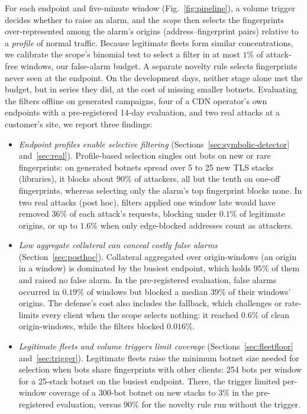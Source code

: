 \documentclass[conference,letterpaper,10pt]{IEEEtran}
\newcommand\1{\textit{(i)}}
\newcommand\2{\textit{(ii)}}
\newcommand\3{\textit{(iii)}}
\newcommand\4{\textit{(iv)}}
\newcommand\5{\textit{(v)}}
\newcommand\6{\textit{(vi)}}
\newcommand\7{\textit{(vii)}}
\newcommand\8{\textit{(viii)}}
\newcommand\9{\textit{(ix)}}
\begin{document}
For each endpoint and five-minute window (Fig.~\ref{fig:pipeline}), a volume trigger decides whether to raise an alarm, and the \textit{scope} then selects the fingerprints over-represented among the alarm's origins (address--fingerprint pairs) relative to a \textit{profile} of normal traffic. Because legitimate fleets form similar concentrations, we calibrate the scope's binomial test to select a filter in at most $1\%$ of attack-free windows, our false-alarm budget. A separate novelty rule selects fingerprints never seen at the endpoint. On the development days, neither stage alone met the budget, but in series they did, at the cost of missing smaller botnets. Evaluating the filters offline on generated campaigns, four of a CDN operator's own endpoints with a pre-registered 14-day evaluation, and two real attacks at a customer's site, we report three findings:
\begin{itemize}
\item \textit{Endpoint profiles enable selective filtering} (Sections~\ref{sec:symbolic-detector} and~\ref{sec:real}). Profile-based selection singles out bots on new or rare fingerprints: on generated botnets spread over 5 to 25 new TLS stacks (libraries), it blocks about $90\%$ of attackers, all but the tenth on one-off fingerprints, whereas selecting only the alarm's top fingerprint blocks none. In two real attacks (post hoc), filters applied one window late would have removed $36\%$ of each attack's requests, blocking under $0.1\%$ of legitimate origins, or up to $1.6\%$ when only edge-blocked addresses count as attackers.
\item \textit{Low aggregate collateral can conceal costly false alarms} (Section~\ref{sec:posthoc}). Collateral aggregated over origin-windows (an origin in a window) is dominated by the busiest endpoint, which holds $95\%$ of them and raised no false alarm. In the pre-registered evaluation, false alarms occurred in $0.19\%$ of windows but blocked a median $39\%$ of their windows' origins. The defense's cost also includes the fallback, which challenges or rate-limits every client when the scope selects nothing: it reached $0.6\%$ of clean origin-windows, while the filters blocked $0.016\%$.
\item \textit{Legitimate fleets and volume triggers limit coverage} (Sections~\ref{sec:fleetfloor} and~\ref{sec:trigger}). Legitimate fleets raise the minimum botnet size needed for selection when bots share fingerprints with other clients: 254 bots per window for a 25-stack botnet on the busiest endpoint. There, the trigger limited per-window coverage of a 300-bot botnet on new stacks to $3\%$ in the pre-registered evaluation, versus $90\%$ for the novelty rule run without the trigger.
\end{itemize}
\end{document}
